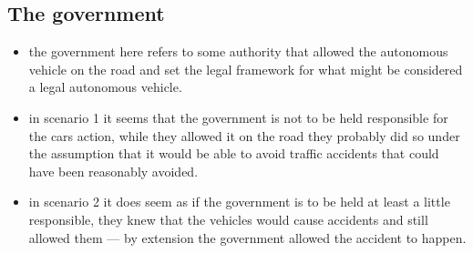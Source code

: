 \subsection{The government}
\begin{itemize}
\item the government here refers to some authority that allowed the autonomous
  vehicle on the road and set the legal framework for what might be considered a
  legal autonomous vehicle.
\item in scenario 1 it seems that the government is not to be held responsible
  for the cars action, while they allowed it on the road they probably did so
  under the assumption that it would be able to avoid traffic accidents that
  could have been reasonably avoided.
\item in scenario 2 it does seem as if the government is to be held at least a
  little responsible, they knew that the vehicles would cause accidents and
  still allowed them --- by extension the government allowed the accident to happen.
\end{itemize}
